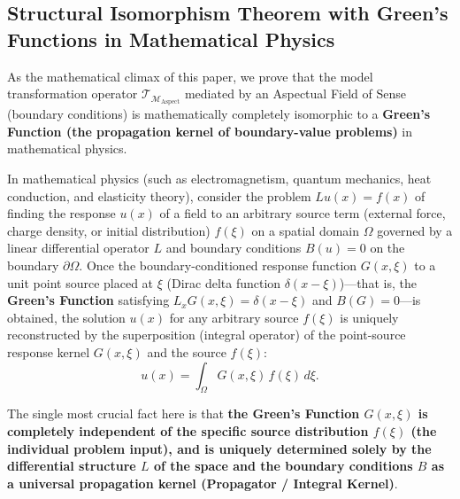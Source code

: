 \documentclass[11pt,a4paper]{article}
\theoremstyle{definition}
\theoremstyle{plain}
\theoremstyle{remark}
\newcommand{\MAspect}{\mathcal{M}_{\mathrm{Aspect}}}
\begin{document}
\subsection{Structural Isomorphism Theorem with Green's Functions in Mathematical Physics}
As the mathematical climax of this paper, we prove that the model transformation operator $\mathcal{T}_{\MAspect}$ mediated by an Aspectual Field of Sense (boundary conditions) is mathematically completely isomorphic to a \textbf{Green's Function (the propagation kernel of boundary-value problems)} in mathematical physics.

In mathematical physics (such as electromagnetism, quantum mechanics, heat conduction, and elasticity theory), consider the problem $L u(x) = f(x)$ of finding the response $u(x)$ of a field to an arbitrary source term (external force, charge density, or initial distribution) $f(\xi)$ on a spatial domain $\Omega$ governed by a linear differential operator $L$ and boundary conditions $B(u) = 0$ on the boundary $\partial\Omega$. Once the boundary-conditioned response function $G(x, \xi)$ to a unit point source placed at $\xi$ (Dirac delta function $\delta(x - \xi)$)---that is, the \textbf{Green's Function} satisfying $L_x G(x, \xi) = \delta(x - \xi)$ and $B(G) = 0$---is obtained, the solution $u(x)$ for any arbitrary source $f(\xi)$ is uniquely reconstructed by the superposition (integral operator) of the point-source response kernel $G(x, \xi)$ and the source $f(\xi)$:
\begin{equation}
u(x) = \int_{\Omega} G(x, \xi)\, f(\xi)\, d\xi.
\end{equation}

The single most crucial fact here is that \textbf{the Green's Function $G(x, \xi)$ is completely independent of the specific source distribution $f(\xi)$ (the individual problem input), and is uniquely determined solely by the differential structure $L$ of the space and the boundary conditions $B$ as a universal propagation kernel (Propagator / Integral Kernel)}.
\end{document}
